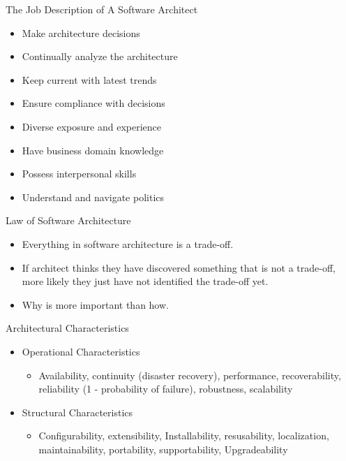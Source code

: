 \documentclass[aspectratio=169, table]{beamer}
\begin{document}
	\begin{frame}{The Job Description of A Software Architect}
		\begin{itemize}
			\item Make architecture decisions
			\item Continually analyze the architecture
			\item Keep current with latest trends
			\item Ensure compliance with decisions
			\item Diverse exposure and experience
			\item Have business domain knowledge
			\item Possess interpersonal skills
			\item Understand and navigate politics
		\end{itemize}
	\end{frame}
	
	\begin{frame}{Law of Software Architecture}
		\begin{itemize}
			\item Everything in software architecture is a trade-off.
			\item If architect thinks they have discovered something that is not a trade-off, more likely they just have not identified the trade-off yet.
			\item Why is more important than how.
		\end{itemize}
	\end{frame}
	
	\begin{frame}{Architectural Characteristics}
		\begin{itemize}
			\item Operational Characteristics
			\begin{itemize}
				\item Availability, continuity (disaster recovery), performance, recoverability, 
				reliability (1 - probability of failure), robustness, scalability
			\end{itemize}
			\item Structural Characteristics
			\begin{itemize}
				\item Configurability, extensibility, Installability, resusability, localization, maintainability, portability, supportability, Upgradeability
			\end{itemize}
			
		\end{itemize}
	\end{frame}
	
\end{document}
